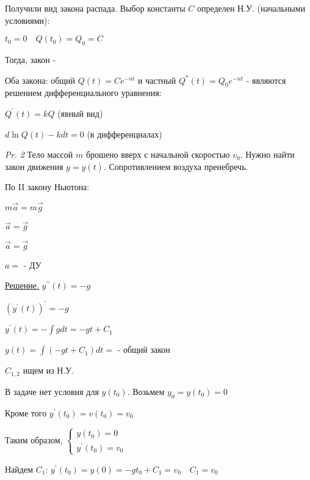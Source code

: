 \documentclass[12pt]{article}
\begin{document}
    Получили вид закона распада. Выбор константы $C$ определен Н.У. (начальными условиями):

    $\displaystyle t_0 = 0 \quad Q(t_0) = Q_0 = C$

    Тогда, закон - 

    \Nota Оба закона: общий $\displaystyle Q(t) = Ce^{-nt}$ и частный $\displaystyle Q^*(t) = Q_0 e^{-nt}$ -
    являются решением дифференциального уравнения:

    $\displaystyle Q^\prime(t) = kQ$  (явный вид)

    $d \ln Q(t) - kdt = 0$ (в дифференциалах)

    \vspace{5mm}

    \textit{Pr. 2} \quad Тело массой $m$ брошено вверх с начальной скоростью $\displaystyle v_0$. Нужно найти закон движения $y = y(t)$.
    Сопротивлением воздуха пренебречь.

    По II закону Ньютона:

    $m\overrightarrow{a} = m\overrightarrow{g}$

    $\overrightarrow{a} = \overrightarrow{g}$

    $\overrightarrow{a} = \overrightarrow{g}$

    $a = $ - ДУ

    \underline{Решение.} \quad $\displaystyle y^{\prime\prime}(t) = -g$

    $\displaystyle (y^{\prime}(t))^\prime = -g$

    $\displaystyle y^{\prime}(t) = -\int g dt = -gt + C_1$

    $\displaystyle y(t) = \int (-gt + C_1) dt = $ - общий закон

    $\displaystyle C_{1,2}$ ищем из Н.У.

    В задаче нет условия для $\displaystyle y(t_0)$. Возьмем $\displaystyle y_0 = y(t_0) = 0$

    Кроме того $\displaystyle y^\prime(t_0) = v(t_0) = v_0$

    Таким образом, $\displaystyle \begin{cases}y(t_0) = 0 \\ y^\prime(t_0) = v_0\end{cases}$

    Найдем $\displaystyle C_1$: $\displaystyle y^\prime(t_0) = y(0) = -gt_0 + C_1 = v_0 \quad C_1 = v_0$
\end{document}
